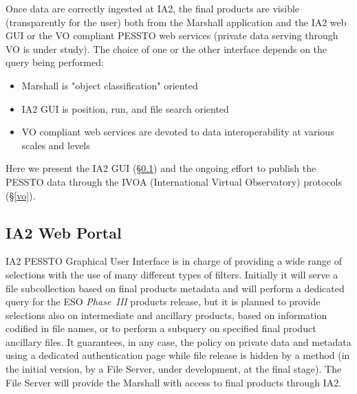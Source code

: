 Once data are correctly ingested at IA2, the final products are visible (transparently for the user) both from the Marshall application and the IA2 web GUI or the VO compliant PESSTO web services (private data serving through VO is under study). The choice of one or the other interface depends on the query being performed:
\begin{itemize}[noitemsep,nolistsep]
	\item Marshall is "object classification" oriented
	\item IA2 GUI is position, run, and file search oriented
	\item VO compliant web services are devoted to data interoperability at various scales and levels
\end{itemize}
Here we present the IA2 GUI (\S \ref{ia2web}) and the ongoing effort to publish the PESSTO data through the IVOA (International Virtual Observatory) protocols (\S \ref{vo}).

\subsection{IA2 Web Portal}\label{ia2web}

IA2 PESSTO Graphical User Interface is in charge of providing a wide range of selections with the use of many different types of filters. Initially it will serve a file subcollection based on final products metadata and will perform a dedicated query for the ESO \textit{Phase~III} products release, but it is planned to provide selections also on intermediate and ancillary products, based on information codified in file names, or to perform a subquery on specified final product ancillary files. It guarantees, in any case, the policy on private data and metadata using a dedicated authentication page while file release is hidden by a method (in the initial version, by a File Server, under development, at the final stage). The File Server will provide the Marshall with access to final products through IA2.

